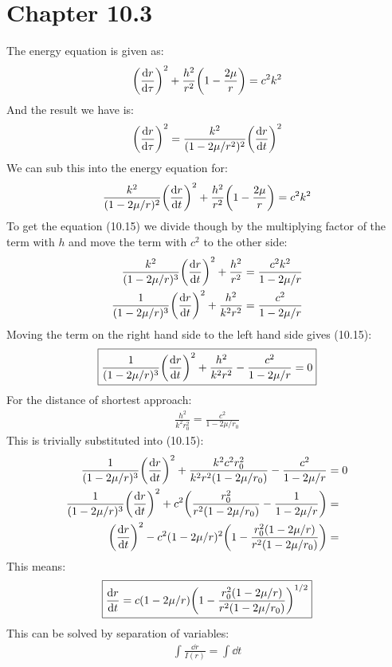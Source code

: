 \documentclass[12pt]{article}
\begin{document}
\section{Chapter 10.3}
The energy equation is given as:
\begin{align*}
  \qty(\dv{r}{\tau})^2+\frac{h^2}{r^2}\qty(1-\frac{2\mu}{r})=c^2k^2
\end{align*}
And the result we have is:
\begin{align*}
  \qty(\dv{r}{\tau})^2=\frac{k^2}{(1-2\mu/r^2)^2}\qty(\dv{r}{t})^2
\end{align*}
We can sub this into the energy equation for:
\begin{align*}
  \frac{k^2}{(1-2\mu/r)^2}\qty(\dv{r}{t})^2+\frac{h^2}{r^2}
  \qty(1-\frac{2\mu}{r})=c^2k^2
\end{align*}
To get the equation (10.15) we divide though by the multiplying factor of the term with $h$ and move the term with $c^2$ to the other side:
\begin{align*}
  \frac{k^2}{(1-2\mu/r)^3}\qty(\dv{r}{t})^2+\frac{h^2}{r^2}&=
  \frac{c^2k^2}{1-2\mu/r}\\
  \frac{1}{(1-2\mu/r)^3}\qty(\dv{r}{t})^2+\frac{h^2}{k^2r^2}&=
  \frac{c^2}{1-2\mu/r}
\end{align*}
Moving the term on the right hand side to the left hand side gives (10.15):
\begin{align*}
  \boxed{
  \frac{1}{(1-2\mu/r)^3}\qty(\dv{r}{t})^2+\frac{h^2}{k^2r^2}-
  \frac{c^2}{1-2\mu/r}=0}
\end{align*}
For the distance of shortest approach:
\begin{align*}
  \frac{h^2}{k^2r_0^2}=\frac{c^2}{1-2\mu/r_0}
\end{align*}
This is trivially substituted into (10.15):
\begin{align*}
  \frac{1}{(1-2\mu/r)^3}\qty(\dv{r}{t})^2+\frac{k^2c^2r_0^2}{k^2r^2(1-2\mu/r_0)}-
  \frac{c^2}{1-2\mu/r}&=0\\
  \frac{1}{(1-2\mu/r)^3}\qty(\dv{r}{t})^2+
  c^2\qty(\frac{r_0^2}{r^2(1-2\mu/r_0)}-\frac{1}{1-2\mu/r})&=\\
  \qty(\dv{r}{t})^2-c^2(1-2\mu/r)^2
  \qty(1-\frac{r_0^2(1-2\mu/r)}{r^2(1-2\mu/r_0)})&=
\end{align*}
This means:
\begin{align*}
  \boxed{
    \dv{r}{t}=c(1-2\mu/r)\qty(1-\frac{r_0^2(1-2\mu/r)}{r^2(1-2\mu/r_0)})^{1/2}
  }
\end{align*}
This can be solved by separation of variables:
\begin{align*}
  \int\frac{\dd{r}}{I(r)}=\int\dd{t}
\end{align*}
\end{document}
